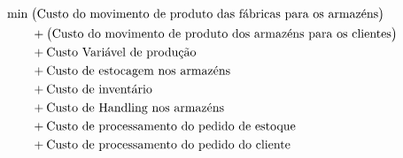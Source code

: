 \documentclass[12pt,a4paper]{article}
\begin{document}


\begin{align*}
    \min\; &\bigl(\text{Custo do movimento de produto das fábricas para os armazéns}\bigr)\notag\\
           &+\bigl(\text{Custo do movimento de produto dos armazéns para os clientes}\bigr)\notag\\
           &+\text{Custo Variável de produção}\notag\\
           &+\text{Custo de estocagem nos armazéns}\notag\\
           &+\text{Custo de inventário}\notag\\
           &+\text{Custo de Handling nos armazéns}\notag\\
           &+\text{Custo de processamento do pedido de estoque}\notag\\
           &+\text{Custo de processamento do pedido do cliente}
  \end{align*}
  
\end{document}

